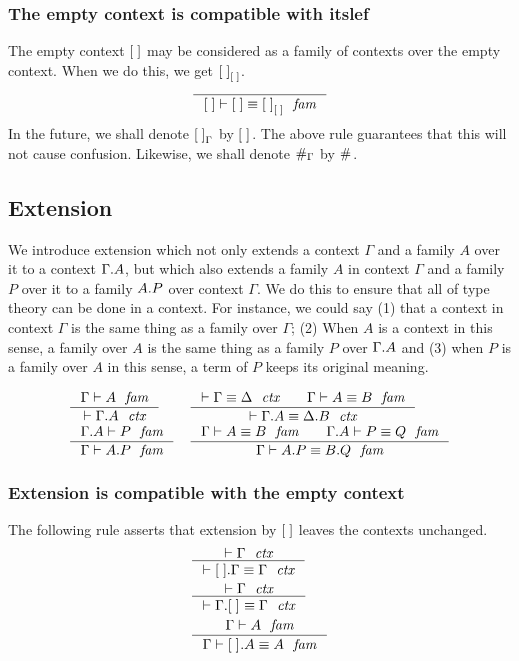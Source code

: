 \subsubsection{The empty context is compatible with itslef}
The empty context $\emptyc$ may be considered as a family of contexts over the empty
context. When we do this, we get $\emptyf[\emptyc]$.
\begin{equation}
\inference{}{\jfameq{\emptyc}{\emptyc}{\emptyf[\emptyc]}}
\end{equation}
In the future, we shall denote $\emptyf[\Gamma]$ by $\emptyf$. The above rule
guarantees that this will not cause confusion. Likewise, we shall denote
$\emptytm[\Gamma]$ by $\emptytm$.

\subsection{Extension}
We introduce extension which not only extends a context $\Gamma$ and a family
$A$ over it to a context $\ctxext{\Gamma}{A}$, but which also extends a family $A$
in context $\Gamma$ and a family $P$ over it to a family $\ctxext{A}{P}$ over context
$\Gamma$. We do this to ensure that all of type theory can be done in a context.
For instance, we could say (1) that a context in context $\Gamma$ is the same thing
as a family over $\Gamma$; (2) When $A$ is a context in this sense, a family over
$A$ is the same thing as a family $P$ over $\ctxext{\Gamma}{A}$ and 
(3) when $P$ is a family over $A$ in this sense, a term of $P$ keeps its original meaning.

\begin{align}
& \inference{\jfam{\Gamma}{A}}{\jctx{\ctxext{\Gamma}{A}}}
& & \inference{\jctxeq{\Gamma}{\Delta}\qquad\jfameq{\Gamma}{A}{B}}{\jctxeq{\ctxext{\Gamma}{A}}{\ctxext{\Delta}{B}}}\\
& \inference{\jfam{\ctxext{\Gamma}{A}}{P}}{\jfam{\Gamma}{\ctxext{A}{P}}}
& & \inference{\jfameq{\Gamma}{A}{B}\qquad\jfameq{\ctxext{\Gamma}{A}}{P}{Q}}{\jfameq{\Gamma}{\ctxext{A}{P}}{\ctxext{B}{Q}}}
\end{align}

\subsubsection{Extension is compatible with the empty context}
The following rule asserts that extension by $\emptyc$ leaves the contexts unchanged.
\begin{align}
& \inference{\jctx{\Gamma}}{\jctxeq{\ctxext{\emptyc}{\Gamma}}{\Gamma}}\\
& \inference{\jctx{\Gamma}}{\jctxeq{\ctxext{\Gamma}{\emptyf}}{\Gamma}}\\
& \inference{\jfam{\Gamma}{A}}{\jfameq{\Gamma}{\ctxext{\emptyf}{A}}{A}}
\end{align}

